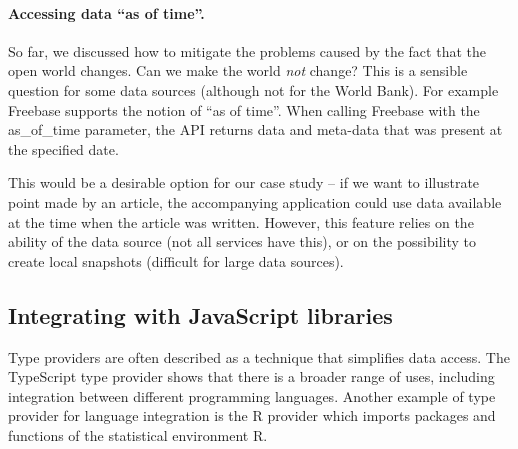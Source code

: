 \documentclass[submission,copyright,creativecommons]{eptcs}
\newcommand{\ident}[1]{\textnormal{\sffamily #1}}
\begin{document}
\vspace{-1em}
\paragraph{Accessing data ``as of time''.}
So far, we discussed how to mitigate the problems caused by the fact that the open world changes.
Can we make the world \emph{not} change? This is a sensible question for some data sources
(although not for the World Bank). For example Freebase \cite{google-freebase} supports the
notion of ``as of time''. When calling Freebase with the \ident{as\_of\_time} parameter, the API
returns data and meta-data that was present at the specified date.

This would be a desirable option for our case study -- if we want to illustrate point made
by an article, the accompanying application could use data available at the time when the
article was written. However, this feature relies on the ability of the data source (not all
services have this), or on the possibility to create local snapshots (difficult for large data
sources).


\subsection{Integrating with JavaScript libraries}
\label{sec:tp-lang}

Type providers are often described as a technique that simplifies data access. The TypeScript
type provider shows that there is a broader range of uses, including integration between different
programming languages. Another example of type provider for language integration is the R
provider \cite{fsharp-rprovider} which imports packages and functions of the statistical
environment R.
\end{document}
